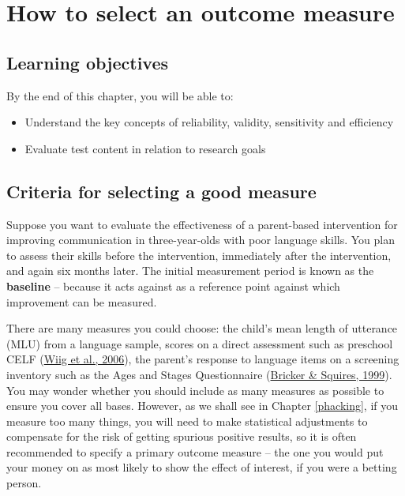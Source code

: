\documentclass{krantz}
\begin{document}
\hypertarget{reliability}{%
\chapter{How to select an outcome measure}\label{reliability}}

\hypertarget{learning-objectives-2}{%
\section{Learning objectives}\label{learning-objectives-2}}

By the end of this chapter, you will be able to:

\begin{itemize}
\item
  Understand the key concepts of reliability, validity, sensitivity and efficiency
\item
  Evaluate test content in relation to research goals
\end{itemize}

\hypertarget{criteria-for-selecting-a-good-measure}{%
\section{Criteria for selecting a good measure}\label{criteria-for-selecting-a-good-measure}}

Suppose you want to evaluate the effectiveness of a parent-based intervention for improving communication in three-year-olds with poor language skills. You plan to assess their skills before the intervention, immediately after the intervention, and again six months later. The initial measurement period is known as the \textbf{baseline} --  because it acts against as a reference point against which improvement can be measured.

There are many measures you could choose: the child's mean length of utterance (MLU) from a language sample, scores on a direct assessment such as preschool CELF (\protect\hyperlink{ref-wiig2006}{Wiig et al., 2006}), the parent's response to language items on a screening inventory such as the Ages and Stages Questionnaire (\protect\hyperlink{ref-bricker1999}{Bricker \& Squires, 1999}). You may wonder whether you should include as many measures as possible to ensure you cover all bases. However, as we shall see in Chapter \ref{phacking}, if you measure too many things, you will need to make statistical adjustments to compensate for the risk of getting spurious positive results, so it is often recommended to specify a primary outcome measure -- the one you would put your money on as most likely to show the effect of interest, if you were a betting person.
\end{document}

